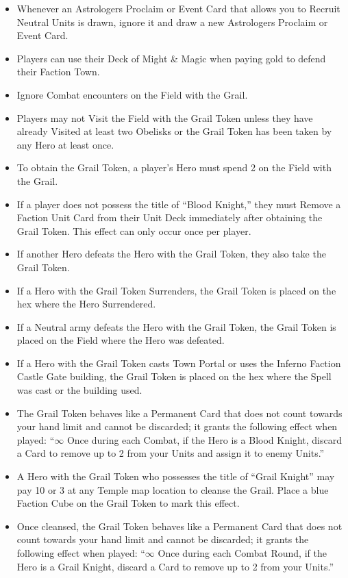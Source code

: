 \begin{multicols*}{2}
\begin{itemize}
  \item Whenever an Astrologers Proclaim or Event Card that allows you to Recruit Neutral Units is drawn, ignore it and draw a new Astrologers Proclaim or Event Card.
  \item Players can use their Deck of Might \& Magic when paying gold to defend their Faction Town.
  \item Ignore Combat encounters on the Field with the Grail.
  \item Players may not Visit the Field with the Grail Token unless they have already Visited at least two Obelisks or the Grail Token has been taken by any Hero at least once.
  \item To obtain the Grail Token, a player’s Hero must spend 2  on the Field with the Grail.
  \item If a player does not possess the title of ``\textcolor{darkcandyapplered}{Blood Knight},'' they must Remove a Faction Unit Card from their Unit Deck immediately after obtaining the Grail Token. This effect can only occur once per player.
  \item If another Hero defeats the Hero with the Grail Token, they also take the Grail Token.
  \item If a Hero with the Grail Token Surrenders, the Grail Token is placed on the hex where the Hero Surrendered.
  \item If a Neutral army defeats the Hero with the Grail Token, the Grail Token is placed on the Field where the Hero was defeated.
  \item If a Hero with the Grail Token casts Town Portal or uses the Inferno Faction Castle Gate building, the Grail Token is placed on the hex where the Spell was cast or the building used.
  \item The Grail Token behaves like a Permanent Card that does not count towards your hand limit and cannot be discarded; it grants the following effect when played: ``$\infty$ Once during each Combat, if the Hero is a \textcolor{darkcandyapplered}{Blood Knight}, discard a Card to remove up to 2  from your Units and assign it to enemy Units.''
  \item A Hero with the Grail Token who possesses the title of ``\textcolor{cobalt}{Grail Knight}'' may pay 10  or 3  at any Temple map location to cleanse the Grail. Place a blue Faction Cube on the Grail Token to mark this effect.
  \item Once cleansed, the Grail Token behaves like a Permanent Card that does not count towards your hand limit and cannot be discarded; it grants the following effect when played: ``$\infty$ Once during each Combat Round, if the Hero is a \textcolor{cobalt}{Grail Knight}, discard a Card to remove up to 2  from your Units.''
\end{itemize}


\end{multicols*}
